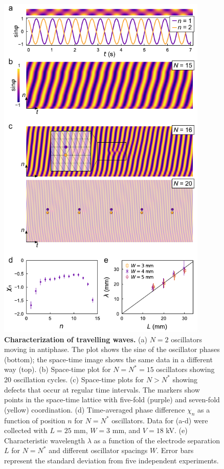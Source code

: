 \begin{figure}[p!]
    \centering
    \includegraphics[width=10cm]{figures/3_2.pdf}
    \caption{\textbf{Characterization of travelling waves.} (a) $N=2$ oscillators moving in antiphase. The plot shows the sine of the oscillator phases (bottom); the space-time image shows the same data in a different way (top). (b) Space-time plot for $N=N^*=15$ oscillators showing 20 oscillation cycles. (c) Space-time plots for $N>N^*$ showing defects that occur at regular time intervals. The markers show points in the space-time lattice with five-fold (purple) and seven-fold (yellow) coordination. (d) Time-averaged phase difference $\chi_n$ as a function of position $n$ for $N=N^*$ oscillators. Data for (a-d) were collected with $L=25$ mm, $W=3$ mm, and $V=18$ kV.  (e) Characteristic wavelength $\lambda$ as a function of the electrode separation $L$ for $N=N^*$ and different oscillator spacings $W$. Error bars represent the standard deviation from five independent experiments.}
    \label{fig:2}
\end{figure}

